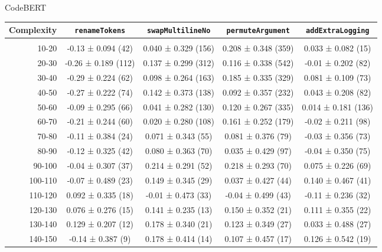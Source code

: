\documentclass[sigconf,review,anonymous]{acmart}
\begin{document}
  {\center

  CodeBERT
    \begin{table}[H]
      \tiny
      \begin{tabular}{r|cccc}
        Complexity          & \lstinline|renameTokens|        & \lstinline|swapMultilineNo|     & \lstinline|permuteArgument|     & \lstinline|addExtraLogging|     \\\hline\\
        10-20               & -0.13 ± 0.094 (42)  & 0.040 ± 0.329 (156) & 0.208 ± 0.348 (359) & 0.033 ± 0.082 (15)  \\
        20-30               & -0.26 ± 0.189 (112) & 0.137 ± 0.299 (312) & 0.116 ± 0.338 (542) & -0.01 ± 0.202 (82)  \\
        30-40               & -0.29 ± 0.224 (62)  & 0.098 ± 0.264 (163) & 0.185 ± 0.335 (329) & 0.081 ± 0.109 (73)  \\
        40-50               & -0.27 ± 0.222 (74)  & 0.142 ± 0.373 (138) & 0.092 ± 0.357 (232) & 0.043 ± 0.208 (82)  \\
        50-60               & -0.09 ± 0.295 (66)  & 0.041 ± 0.282 (130) & 0.120 ± 0.267 (335) & 0.014 ± 0.181 (136) \\
        60-70               & -0.21 ± 0.244 (60)  & 0.020 ± 0.280 (108) & 0.161 ± 0.252 (179) & -0.02 ± 0.211 (98)  \\
        70-80               & -0.11 ± 0.384 (24)  & 0.071 ± 0.343 (55)  & 0.081 ± 0.376 (79)  & -0.03 ± 0.356 (73)  \\
        80-90               & -0.12 ± 0.325 (42)  & 0.080 ± 0.363 (70)  & 0.035 ± 0.429 (97)  & -0.04 ± 0.350 (75)  \\
        90-100              & -0.04 ± 0.307 (37)  & 0.214 ± 0.291 (52)  & 0.218 ± 0.293 (70)  & 0.075 ± 0.226 (69)  \\
        100-110             & -0.07 ± 0.489 (23)  & 0.149 ± 0.345 (29)  & 0.037 ± 0.427 (44)  & 0.140 ± 0.467 (41)  \\
        110-120             & 0.092 ± 0.335 (18)  & -0.01 ± 0.473 (33)  & -0.04 ± 0.499 (43)  & -0.11 ± 0.236 (32)  \\
        120-130             & 0.076 ± 0.276 (15)  & 0.141 ± 0.235 (13)  & 0.150 ± 0.352 (21)  & 0.111 ± 0.355 (22)  \\
        130-140             & 0.129 ± 0.207 (12)  & 0.178 ± 0.340 (21)  & 0.123 ± 0.349 (27)  & 0.033 ± 0.488 (27)  \\
        140-150             & -0.14 ± 0.387 (9)   & 0.178 ± 0.414 (14)  & 0.107 ± 0.457 (17)  & 0.126 ± 0.542 (19)  \\
      \end{tabular}
    \end{table}


}
\end{document}
